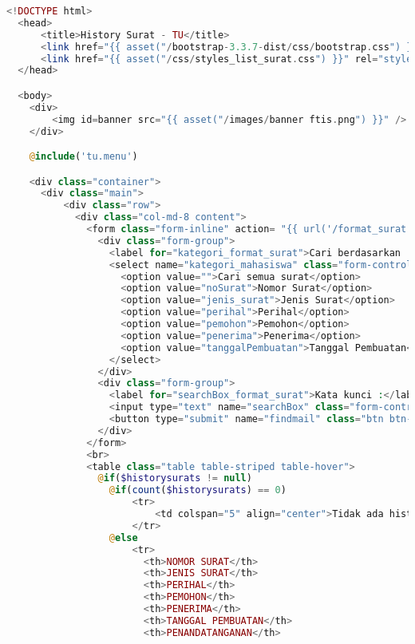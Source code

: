 \begin{lstlisting}[language=php,basicstyle=\tiny,caption=\textit{History} TU]
	<!DOCTYPE html>
  <head>
      <title>History Surat - TU</title>
      <link href="{{ asset("/bootstrap-3.3.7-dist/css/bootstrap.css") }}" rel="stylesheet" type="text/css" />
      <link href="{{ asset("/css/styles_list_surat.css") }}" rel="stylesheet" type="text/css" />
  </head>

  <body>
    <div>
        <img id=banner src="{{ asset("/images/banner ftis.png") }}" />
    </div>

    @include('tu.menu')

    <div class="container">
      <div class="main">
          <div class="row">
            <div class="col-md-8 content">
              <form class="form-inline" action= "{{ url('/format_surat') }}" method="get">
                <div class="form-group">
                  <label for="kategori_format_surat">Cari berdasarkan :</label><br>
                  <select name="kategori_mahasiswa" class="form-control">
                    <option value="">Cari semua surat</option>
                    <option value="noSurat">Nomor Surat</option>
                    <option value="jenis_surat">Jenis Surat</option>
                    <option value="perihal">Perihal</option>
                    <option value="pemohon">Pemohon</option>
                    <option value="penerima">Penerima</option>
                    <option value="tanggalPembuatan">Tanggal Pembuatan</option>
                  </select>
                </div>
                <div class="form-group">
                  <label for="searchBox_format_surat">Kata kunci :</label><br>
                  <input type="text" name="searchBox" class="form-control" size="68" />
                  <button type="submit" name="findmail" class="btn btn-primary">Cari surat</button>
                </div>
              </form>
              <br>
              <table class="table table-striped table-hover">
                @if($historysurats != null)
                  @if(count($historysurats) == 0)
                      <tr>
                          <td colspan="5" align="center">Tidak ada history surat....</td>
                      </tr>
                  @else
                      <tr>
                        <th>NOMOR SURAT</th>
                        <th>JENIS SURAT</th>
                        <th>PERIHAL</th>
                        <th>PEMOHON</th>
                        <th>PENERIMA</th>
                        <th>TANGGAL PEMBUATAN</th>
                        <th>PENANDATANGANAN</th>

\end{lstlisting}
